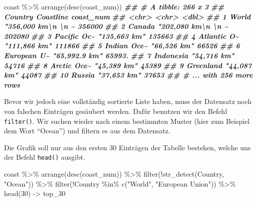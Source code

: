 \documentclass[11pt,german,a4paper]{article}
\newenvironment{Shaded}{\begin{snugshade}}{\end{snugshade}}
\newcommand{\DecValTok}[1]{\textcolor[rgb]{0.00,0.00,0.81}{#1}}
\newcommand{\DocumentationTok}[1]{\textcolor[rgb]{0.56,0.35,0.01}{\textbf{\textit{#1}}}}
\newcommand{\FunctionTok}[1]{\textcolor[rgb]{0.00,0.00,0.00}{#1}}
\newcommand{\NormalTok}[1]{#1}
\newcommand{\OtherTok}[1]{\textcolor[rgb]{0.56,0.35,0.01}{#1}}
\newcommand{\SpecialCharTok}[1]{\textcolor[rgb]{0.00,0.00,0.00}{#1}}
\newcommand{\StringTok}[1]{\textcolor[rgb]{0.31,0.60,0.02}{#1}}
\begin{document}
\begin{Shaded}
\begin{Highlighting}[]
\NormalTok{coast }\SpecialCharTok{\%\textgreater{}\%}
  \FunctionTok{arrange}\NormalTok{(}\FunctionTok{desc}\NormalTok{(coast\_num))}
\DocumentationTok{\#\# \# A tibble: 266 x 3}
\DocumentationTok{\#\#    Country     Coastline                      coast\_num}
\DocumentationTok{\#\#    \textless{}chr\textgreater{}       \textless{}chr\textgreater{}                              \textless{}dbl\textgreater{}}
\DocumentationTok{\#\#  1 World       "356,000 km\textbackslash{}n          \textbackslash{}n    \textasciitilde{}   356000 }
\DocumentationTok{\#\#  2 Canada      "202,080 km\textbackslash{}n          \textbackslash{}n    \textasciitilde{}   202080 }
\DocumentationTok{\#\#  3 Pacific Oc\textasciitilde{} "135,663 km"                     135663 }
\DocumentationTok{\#\#  4 Atlantic O\textasciitilde{} "111,866 km"                     111866 }
\DocumentationTok{\#\#  5 Indian Oce\textasciitilde{} "66,526 km"                       66526 }
\DocumentationTok{\#\#  6 European U\textasciitilde{} "65,992.9 km"                     65993.}
\DocumentationTok{\#\#  7 Indonesia   "54,716 km"                       54716 }
\DocumentationTok{\#\#  8 Arctic Oce\textasciitilde{} "45,389 km"                       45389 }
\DocumentationTok{\#\#  9 Greenland   "44,087 km"                       44087 }
\DocumentationTok{\#\# 10 Russia      "37,653 km"                       37653 }
\DocumentationTok{\#\# \# ... with 256 more rows}
\end{Highlighting}
\end{Shaded}

Bevor wir jedoch eine vollständig sortierte Liste haben, muss der Datensatz noch von falschen Einträgen gesäubert werden. Dafür benutzen wir den Befehl \texttt{filter()}. Wir suchen wieder nach einem bestimmten Muster (hier zum Beispiel dem Wort ``Ocean'') und filtern es aus dem Datensatz.

Die Grafik soll nur aus den ersten 30 Einträgen der Tabelle bestehen, welche uns der Befehl \texttt{head()} ausgibt.

\begin{Shaded}
\begin{Highlighting}[]
\NormalTok{coast }\SpecialCharTok{\%\textgreater{}\%}
  \FunctionTok{arrange}\NormalTok{(}\FunctionTok{desc}\NormalTok{(coast\_num)) }\SpecialCharTok{\%\textgreater{}\%}
  \FunctionTok{filter}\NormalTok{(}\SpecialCharTok{!}\FunctionTok{str\_detect}\NormalTok{(Country, }\StringTok{"Ocean"}\NormalTok{)) }\SpecialCharTok{\%\textgreater{}\%}
  \FunctionTok{filter}\NormalTok{(}\SpecialCharTok{!}\NormalTok{Country }\SpecialCharTok{\%in\%} \FunctionTok{c}\NormalTok{(}\StringTok{"World"}\NormalTok{, }\StringTok{"European Union"}\NormalTok{)) }\SpecialCharTok{\%\textgreater{}\%}
  \FunctionTok{head}\NormalTok{(}\DecValTok{30}\NormalTok{) }\OtherTok{{-}\textgreater{}}\NormalTok{ top\_30}
\end{Highlighting}
\end{Shaded}
\end{document}
